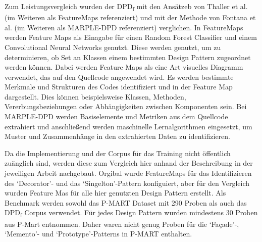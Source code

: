 \documentclass[conference]{IEEEtran}
\begin{document}
Zum Leistungsvergleich wurden der DPD\textsubscript{f} mit den Ansätzeb von Thaller et al. \cite{8667978} (im Weiteren als FeatureMaps referenziert) und mit der Methode von Fontana et al. \cite{ARCELLIFONTANA20112334} (im Weiteren als MARPLE-DPD referenziert) verglichen.
In FeatureMaps werden Feature Maps als Einagabe für einen Random Forest Classifier und einem Convolutional Neural Networks genutzt. Diese werden genutzt, um zu determinieren, ob Set an Klassen einem bestimmten Design Pattern zugeordnet werden können.
Dabei werden Feature Maps als eine Art visuelles Diagramm verwendet, das auf den Quellcode angewendet wird. Es werden bestimmte Merkmale und Strukturen des Codes identifiziert und in der Feature Map dargestellt. Dies können beispielsweise Klassen, Methoden, Vererbungsbeziehungen oder Abhängigkeiten zwischen Komponenten sein.
Bei MARPLE-DPD werden Basiselemente und Metriken aus dem Quellcode extrahiert und anschließend werden maschinelle Lernalgorithmen eingesetzt, um Muster und Zusammenhänge in den extrahierten Daten zu identifizieren.

Da die Implementierung und der Corpus für das Training nicht öffentlich zuänglich sind, werden diese zum Vergleich hier anhand der Beschreibung in der jeweiligen Arbeit nachgebaut.
Orgibal wurde FeatureMaps für das Identifizieren des `Decorator'- und das `Singelton'-Pattern konfiguiert, aber für den Vergleich wurden Feature Mas für alle hier genutzten Design Pattern erstellt.
Als Benchmark werden sowohl das P-MART Dataset mit 290 Proben als auch das DPD\textsubscript{f} Corpus verwendet. Für jedes Design Pattern wurden mindestens 30 Proben aus P-Mart entnommen.
Daher waren nicht genug Proben für die `Façade'-, `Memento'- und `Prototype'-Patterns in P-MART enthalten. 
\end{document}
